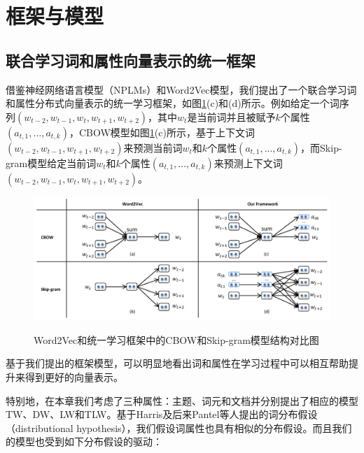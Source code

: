 \documentclass[master]{njuthesis}
\begin{document}
\section{框架与模型}\label{sec_our_models_chap4}

\subsection{联合学习词和属性向量表示的统一框架}\label{subsec_unifiedfk_chap4}

借鉴神经网络语言模型（NPLMs）和Word2Vec模型，我们提出了一个联合学习词和属性分布式向量表示的统一学习框架，如图\ref{fig:ourfk_chap4}(c)和(d)所示。例如给定一个词序列$(w_{t-2}, w_{t-1}, w_t, w_{t+1}, w_{t+2})$，其中$w_t$是当前词并且被赋予$k$个属性$(a_{t,1}, ..., a_{t,k})$，CBOW模型如图\ref{fig:ourfk_chap4}(c)所示，基于上下文词$(w_{t-2}, w_{t-1}, w_{t+1}, w_{t+2})$来预测当前词$w_t$和$k$个属性$(a_{t,1}, ..., a_{t,k})$，而Skip-gram模型给定当前词$w_t$和$k$个属性$(a_{t,1}, ..., a_{t,k})$来预测上下文词$(w_{t-2}, w_{t-1}, w_t, w_{t+1}, w_{t+2})$。

\begin{figure}[htbp]
  \centering
  \includegraphics[width= 1.0\textwidth]{figures//our_framework_chap4.pdf}\\
  \caption{Word2Vec和统一学习框架中的CBOW和Skip-gram模型结构对比图}\label{fig:ourfk_chap4}
\end{figure}

基于我们提出的框架模型，可以明显地看出词和属性在学习过程中可以相互帮助提升来得到更好的向量表示。

特别地，在本章我们考虑了三种属性：主题、词元和文档并分别提出了相应的模型TW、DW、LW和TLW。基于Harris及后来Pantel等人提出的词分布假设（distributional hypothesis）\cite{harris1954distributional,pantel2005inducing}，我们假设词属性也具有相似的分布假设。而且我们的模型也受到如下分布假设的驱动：
\end{document}

